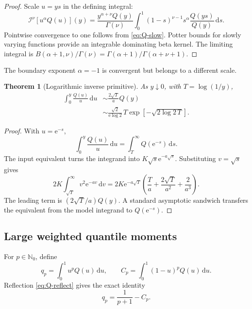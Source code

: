 \documentclass[11pt,oneside]{article}
\newtheorem{theorem}{Theorem}[section]
\theoremstyle{definition}
\theoremstyle{remark}
\newcommand{\N}{\mathbb N}
\newcommand{\dd}{\,\mathrm d}
\newcommand{\e}{\mathrm e}
\newcommand{\RL}{\mathcal I}
\newcommand{\1}{\mathbf 1}
\begin{document}
\begin{proof}
Scale \(u=ys\) in the defining integral:
\[
 \RL^\nu[u^\alpha Q(u)](y)
 =\frac{y^{\alpha+\nu}Q(y)}{\Gamma(\nu)}
 \int_0^1(1-s)^{\nu-1}s^\alpha\frac{Q(ys)}{Q(y)}\dd s.
\]
Pointwise convergence to one follows from \eqref{eq:Q-slow}.  Potter bounds
for slowly varying functions provide an integrable dominating beta kernel.
The limiting integral is
\(B(\alpha+1,\nu)/\Gamma(\nu)
=\Gamma(\alpha+1)/\Gamma(\alpha+\nu+1)\).
\end{proof}

The boundary exponent \(\alpha=-1\) is convergent but belongs to a different
scale.

\begin{theorem}[Logarithmic inverse primitive]\label{thm:Q-log-asympt}
As \(y\downarrow0\), with \(T=\log(1/y)\),
\begin{align}
 \int_0^y\frac{Q(u)}u\dd u
 &\sim\frac{2\sqrt T}{a}Q(y)                                  \label{eq:Q-log-relative}\\
 &\sim\frac{\sqrt2}{\e\log2}\,T
 \exp\!\left[-\sqrt{2\log2\,T}\right].                     \label{eq:Q-log-explicit}
\end{align}
\end{theorem}

\begin{proof}
With \(u=\e^{-s}\),
\[
 \int_0^y\frac{Q(u)}u\dd u=\int_T^\infty Q(\e^{-s})\dd s.
\]
The input equivalent turns the integrand into
\(K\sqrt s\e^{-a\sqrt s}\).  Substituting \(v=\sqrt s\) gives
\[
 2K\int_{\sqrt T}^{\infty}v^2\e^{-av}\dd v
 =2K\e^{-a\sqrt T}
 \left(\frac{T}{a}+\frac{2\sqrt T}{a^2}+\frac2{a^3}\right).
\]
The leading term is \((2\sqrt T/a)Q(y)\).  A standard asymptotic sandwich
transfers the equivalent from the model integrand to \(Q(\e^{-s})\).
\end{proof}

\subsection{Large weighted quantile moments}
For \(p\in\N_0\), define
\begin{equation}
 q_p=\int_0^1u^pQ(u)\dd u,
 \qquad
 C_p=\int_0^1(1-u)^pQ(u)\dd u.                                 \label{eq:qCp}
\end{equation}
Reflection \eqref{eq:Q-reflect} gives the exact identity
\begin{equation}
 q_p=\frac1{p+1}-C_p.                                          \label{eq:q-reflection}
\end{equation}
\end{document}
